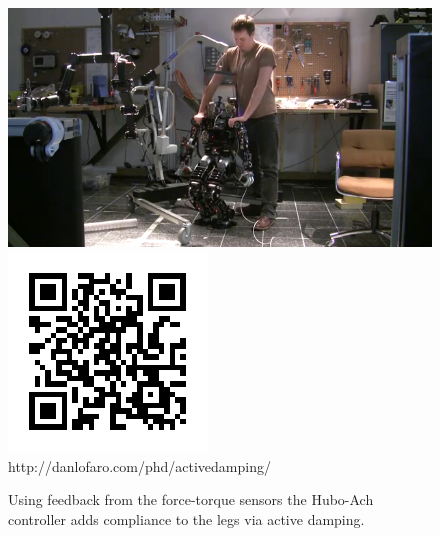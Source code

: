 \begin{figure}[thpb]
  \centering
\includegraphics[width=0.6\columnwidth]{./pix/activedamping.png}
\includegraphics[width=0.3\columnwidth]{./qrcode/qrcode-activedamping.png}\\
     http://danlofaro.com/phd/activedamping/
  \caption{Using feedback from the force-torque sensors the Hubo-Ach controller adds compliance to the legs via active damping. }
  \label{fig:activedamping}
\end{figure}
